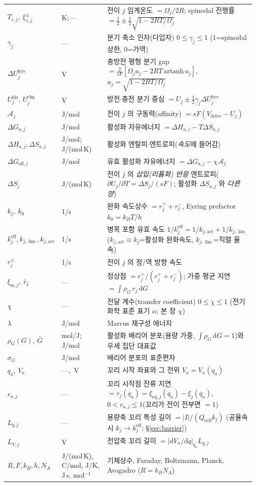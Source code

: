 \documentclass[11pt,a4paper]{article}
\newcommand{\dd}{\mathrm{d}}
\newcommand{\eff}{\mathrm{eff}}
\newcommand{\eq}{\mathrm{eq}}
\newcommand{\drive}{\mathrm{drive}}
\newcommand{\cell}{\mathrm{cell}}
\newcommand{\sstat}{\mathrm{ss}}
\newcommand{\dis}{\mathrm{dis}}
\newcommand{\chg}{\mathrm{chg}}
\newcommand{\hys}{\mathrm{hys}}
\begin{document}
\begin{longtable}{p{} p{} p{}}
$T_{c,j},\ \xi_{s,j}^\pm$ & K;\,--- & 전이 $j$ 임계온도 $=\Omega_j/2R$; spinodal 진행률 $=\tfrac12\pm\tfrac12\sqrt{1-2RT/\Omega_j}$ \\
$\gamma_j$ & --- & 분기 축소 인자(다입자) $0\le\gamma_j\le1$ ($1$=spinodal 상한, $0$=가역) \\
$\Delta U_j^\hys$ & V & 충방전 평형 분기 gap $=\tfrac{2}{sF}[\Omega_j u_j-2RT\,\mathrm{artanh}\,u_j]$, $u_j=\sqrt{1-2RT/\Omega_j}$ \\
$U_j^{\dis},\,U_j^{\chg}$ & V & 방전$\cdot$충전 분기 중심 $=U_j\pm\tfrac12\gamma_j\Delta U_j^\hys$ \\
$\mathcal A_j$ & J/mol & 전이 $j$ 의 구동력(affinity) $=sF(V_\drive-U_j)$ \\
$\Delta G_{a,j}$ & J/mol & 활성화 자유에너지 $=\Delta H_{a,j}-T\Delta S_{a,j}$ \\
$\Delta H_{a,j},\Delta S_{a,j}$ & {\footnotesize J/mol;\,J/(mol\,K)} & 활성화 엔탈피$\cdot$엔트로피(\emph{속도}에 들어감) \\
$\Delta G_{\eff,j}$ & J/mol & 유효 활성화 자유에너지 $=\Delta G_{a,j}-\chi\mathcal A_j$ \\
$\Delta S_j$ & J/(mol\,K) & 전이 $j$ 의 \emph{삽입(리튬화) 반응} 엔트로피($\partial U_j/\partial T=\Delta S_j/(sF)$; 활성화 $\Delta S_{a,j}$ 와 \emph{다른 양}) \\
$k_j,\ k_0$ & 1/s & 완화 속도상수 $=r_j^++r_j^-$, Eyring prefactor $k_0=k_BT/h$ \\
$k_j^{\eff},k_{j,\lim},k_{j,\mathrm{act}}$ & 1/s & 병목 포함 유효 속도 $1/k_j^{\eff}=1/k_{j,\mathrm{act}}+1/k_{j,\lim}$ ($k_{j,\mathrm{act}}\!\equiv\!k_j$=활성화 완화속도, $k_{j,\lim}$=직렬 율속) \\
$r_j^\pm$ & 1/s & 전이 $j$ 의 정/역 방향 속도 \\
$\xi_{\sstat,j},\ \bar r_j$ & --- & 정상점 $=r_j^+/(r_j^++r_j^-)$; 가중 평균 지연 $=\int\rho_G\,r_j\,\dd G$ \\
$\chi$ & --- & 전달 계수(transfer coefficient) $0\le\chi\le1$ (전기화학 표준 표기 $\alpha$; 본 장 $\chi$) \\
$\lambda$ & J/mol & Marcus 재구성 에너지 \\
$\rho_G(G),\ \bar G$ & mol/J;\,J/mol & 활성화 배리어 분포(용량 가중, $\int\rho_G\,\dd G=1$)와 우세 집단 대표값 \\
$\sigma_G$ & J/mol & 배리어 분포의 표준편차 \\
$q_a,\ V_a$ & ---,\ V & 꼬리 시작 좌표와 그 전위 $V_a=V_n(q_a)$ \\
$r_{a,j}$ & --- & 꼬리 시작점 잔류 지연 $=r_j(q_a)=\xi_{\eq,j}(q_a)-\xi_j(q_a)$, $0<r_{a,j}\le1$(꼬리가 전이 전부면 $=1$) \\
$L_{q,j}$ & --- & 용량축 꼬리 특성 길이 $=|I|/(Q_\cell k_j)$ (공율속 시 $k_j\!\to\!k_j^{\eff}$; \S\ref{sec:barrier}) \\
$L_{V,j}$ & V & 전압축 꼬리 길이 $=|\dd V_n/\dd q|_{q_a}L_{q,j}$ \\
$R,F,k_B,h,N_A$ & {\footnotesize J/(mol\,K), C/mol, J/K, J\,s, mol$^{-1}$} & 기체상수, Faraday, Boltzmann, Planck, Avogadro ($R=k_BN_A$) \\
\bottomrule
\end{longtable}
\end{document}

